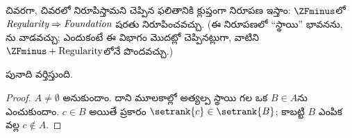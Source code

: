 \documentclass[../../../include/open-logic-section]{subfiles}
\begin{document}
చివరగా,  చివరలో నిరూపిస్తామని చెప్పిన ఫలితానికి
క్లుప్తంగా నిరూపణ ఇస్తాం: $\ZFminus$లో $\emph{Regularity} \Rightarrow \emph{Foundation}$ షరతు నిరూపించవచ్చు. (ఈ నిరూపణలో ``స్థాయి'' భావనను, ను వాడవచ్చు; ఎందుకంటే ఈ విభాగం మొదట్లో చెప్పినట్లుగా, వాటిని $\ZFminus + \text{Regularity}$లోనే పొందవచ్చు.)

\begin{prop} పునాది వర్తిస్తుంది.
\end{prop}

\begin{proof}
$A \neq \emptyset$ అనుకుందాం. దాని మూలకాల్లో అత్యల్ప
స్థాయి గల ఒక $B \in A$ను ఎంచుకుందాం. $c \in B$ అయితే  ప్రకారం $\setrank{c} \in \setrank{B}$; కాబట్టి $B$ ఎంపిక వల్ల $c \notin A$.
\end{proof}
\end{document}
